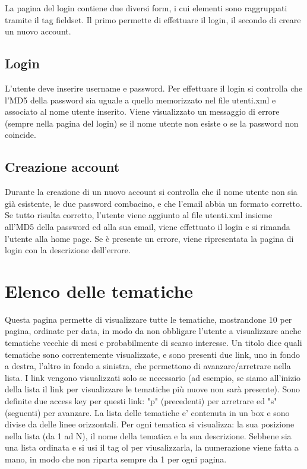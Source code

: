 \documentclass[a4paper,10pt]{article}
\begin{document}
La pagina del login contiene due diversi form, i cui elementi sono raggruppati tramite il tag fieldset. Il primo permette di effettuare il login, il secondo di creare un nuovo account.

\subsection{Login}
L'utente deve inserire username e password. Per effettuare il login si controlla che l'MD5 della password sia uguale a quello memorizzato nel file utenti.xml e associato al nome utente inserito. Viene visualizzato un messaggio di errore (sempre nella pagina del login) se il nome utente non esiste o se la password non coincide.
\subsection{Creazione account}
Durante la creazione di un nuovo account si controlla che il nome utente non sia gi\`a esistente, le due password combacino, e che l'email abbia un formato corretto. Se tutto risulta corretto, l'utente viene aggiunto al file utenti.xml insieme all'MD5 della password ed alla sua email, viene effettuato il login e si rimanda l'utente alla home page. Se \`e presente un errore, viene ripresentata la pagina di login con la descrizione dell'errore.

\section{Elenco delle tematiche}

Questa pagina permette di visualizzare tutte le tematiche, mostrandone 10 per pagina, ordinate per data, in modo da non obbligare l'utente a visualizzare anche tematiche vecchie di mesi e probabilmente di scarso interesse. Un titolo dice quali tematiche sono correntemente visualizzate, e sono presenti due link, uno in fondo a destra, l'altro in fondo a sinistra, che permettono di avanzare/arretrare nella lista. I link vengono visualizzati solo se necessario (ad esempio, se siamo all'inizio della lista il link per visualizzare le tematiche pi\`u nuove non sar\`a presente). Sono definite due access key per questi link: "p" (precedenti) per arretrare ed "s" (seguenti) per avanzare.
La lista delle tematiche e' contenuta in un box e sono divise da delle linee orizzontali. Per ogni tematica si visualizza: la sua posizione nella lista (da 1 ad N), il nome della tematica e la sua descrizione. Sebbene sia una lista ordinata e si usi il tag ol per viusalizzarla, la numerazione viene fatta a mano, in modo che non riparta sempre da 1 per ogni pagina.
\end{document}
